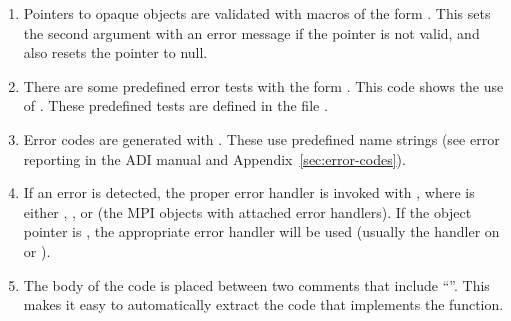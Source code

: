 \documentclass{article}
\begin{document}
\begin{enumerate}
%

\item Pointers to opaque objects are validated with macros of the
  form .  This sets the second argument with an
  error message if the pointer is not valid, and also resets the pointer
  to null. 

\item There are some predefined error tests with the form
  .   This code shows the use of
  .  These predefined tests are defined
  in the file .

\item Error codes are generated with .  These use
  predefined name strings (see error reporting in the ADI manual and
  Appendix~\ref{sec:error-codes}). 

\item If an error is detected, the proper error handler is invoked
  with , where  is either
  , , or  (the MPI objects with attached
  error handlers).  If the object pointer is , the
  appropriate error handler will be used (usually the handler on
   or ).

\item The body of the code is placed between two comments that include
  ``''.  This makes it easy to automatically
  extract the code that implements the function.


\end{enumerate}
\end{document}

